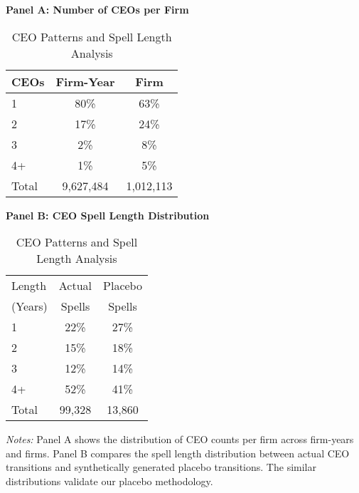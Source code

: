 \begin{table}[htbp]
\centering
\caption{CEO Patterns and Spell Length Analysis}
\label{tab:ceo_patterns}

\textbf{Panel A: Number of CEOs per Firm}
\begin{tabular}{lcc}
\toprule
CEOs & Firm-Year & Firm \\
\midrule
1 & 80\% & 63\% \\
2 & 17\% & 24\% \\
3 & 2\% & 8\% \\
4+ & 1\% & 5\% \\
Total &    9,627,484 &    1,012,113 \\
\bottomrule
\end{tabular}

\vspace{0.5cm}

\textbf{Panel B: CEO Spell Length Distribution}
\begin{tabular}{lcc}
\toprule
Length & Actual & Placebo \\
(Years) & Spells & Spells \\
\midrule
1 & 22\% & 27\% \\
2 & 15\% & 18\% \\
3 & 12\% & 14\% \\
4+ & 52\% & 41\% \\
Total &       99,328 &       13,860 \\
\bottomrule
\end{tabular}

\begin{minipage}{12cm}
\footnotesize
\textit{Notes:} Panel A shows the distribution of CEO counts per firm across firm-years and firms. Panel B compares the spell length distribution between actual CEO transitions and synthetically generated placebo transitions. The similar distributions validate our placebo methodology.
\end{minipage}
\end{table}